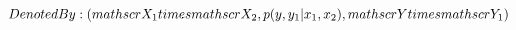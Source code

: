 \documentclass[preview]{standalone}
\begin{document}
\begin{center}
$Denoted By: (\\mathscr{X}_1 \\times \\mathscr{X}_2 ,p(y,y_1|x_1,x_2),\\mathscr{Y} \\times \\mathscr{Y}_1)$
\end{center}
\end{document}
